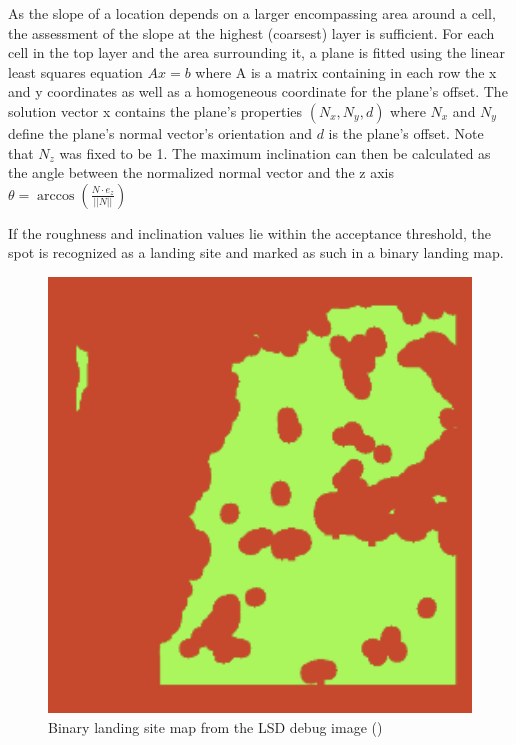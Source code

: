 As the slope of a location depends on a larger encompassing area around a cell, the assessment of the slope at the highest (coarsest) layer is sufficient. For each cell in the top layer and the area surrounding it, a plane is fitted using the linear least squares equation $Ax = b$ where A is a matrix containing in each row the x and y coordinates as well as a homogeneous coordinate for the plane's offset. The solution vector x contains the plane's properties $\left(N_x, N_y, d\right)$ where $N_x$ and $N_y$ define the plane's normal vector's orientation and $d$ is the plane's offset. Note that $N_z$ was fixed to be 1. The maximum inclination can then be calculated as the angle between the normalized normal vector and the z axis $\theta = \arccos\left(\frac{N \cdot e_z}{||N||}\right)$

If the roughness and inclination values lie within the acceptance threshold, the spot is recognized as a landing site and marked as such in a binary landing map. 

\begin{figure}[ht!]
    \centering
    \includegraphics[scale=0.5]{images/system_overview/ls_map.png}
    \caption{Binary landing site map from the LSD debug image (\citet{LSD2})}
    \label{fig:ls_map}
\end{figure}

